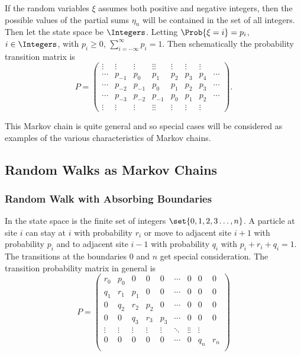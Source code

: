 \documentclass[12pt]{article}
\begin{document}
If the random variables \( \xi \) assumes both positive and negative
integers, then the possible values of the partial sums \( \eta_n \) will
be contained in the set of all integers.  Then let the state space be \(
\Integers \).  Letting \( \Prob{\xi = i} = p_{i} \), \( i \in \Integers \),
with \( p_i \ge 0 \), \( \sum_{i=-\infty}^{\infty} p_i = 1 \). Then
schematically the probability transition matrix is
\[
    P =
    \begin{pmatrix}
        \vdots & \vdots & \vdots & \vdots \vdots & \vdots & \vdots &
        \vdots \\
        \cdots & p_{-1} & p_0 & p_1 & p_2 & p_3 & p_4 & \cdots \\
        \cdots & p_{-2} & p_{-1} & p_0 & p_1 & p_2 & p_3 & \cdots \\
        \cdots & p_{-3} & p_{-2} & p_{-1} & p_0 & p_1 & p_2 & \cdots \\
        \vdots & \vdots & \vdots & \vdots \vdots & \vdots & \vdots &
        \vdots
    \end{pmatrix}.
\]

This Markov chain is quite general and so special cases will be
considered as examples of the various characteristics of Markov chains.

\subsection*{Random Walks as Markov Chains}

\subsubsection*{Random Walk with Absorbing Boundaries}

In  the state space is the finite set
of integers \( \set{0, 1, 2, 3 \dots, n} \).%
A particle at site \( i \) can stay at \( i \) with probability \( r_i \)
or move to adjacent site \( i+1 \) with probability \( p_i \) and to
adjacent site \( i-1 \) with probability \( q_i \) with \( p_i+r_i+q_i =
1 \).  The transitions at the boundaries \( 0 \) and \( n \) get special
consideration.  The transition probability matrix in general is
\[
    P =
    \begin{pmatrix}
        r_0 & p_0 & 0 & 0 & 0 & \cdots & 0 & 0 & 0 \\
        q_1 & r_1 & p_1 & 0 & 0 & \cdots & 0 & 0 & 0 \\
        0 & q_2 & r_2 & p_2 & 0 & \cdots & 0 & 0 & 0 \\
        0 & 0 & q_3 & r_3 & p_3 & \cdots & 0 & 0 & 0 \\
        \vdots & \vdots & \vdots & \vdots & \vdots & \ddots & \vdots
        \vdots & \vdots \\
        0 & 0 & 0 & 0 & 0 & \cdots & 0 & q_n & r_n \\
    \end{pmatrix}
\]
\end{document}
